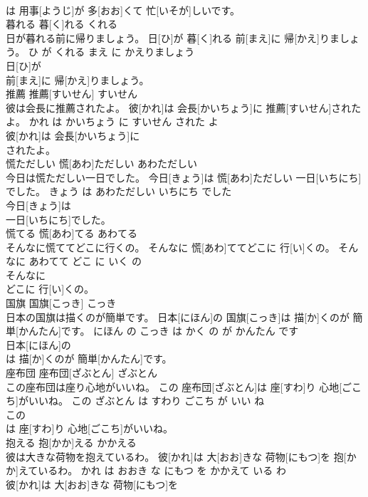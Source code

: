\documentclass[8pt]{extreport}
\begin{document}
\begin{CJK}{UTF8}{min}
\\	は 用事[ようじ]が 多[おお]くて 忙[いそが]しいです。			
\\	暮れる	暮[く]れる	くれる	
\\	日が暮れる前に帰りましょう。	日[ひ]が 暮[く]れる 前[まえ]に 帰[かえ]りましょう。	ひ が くれる まえ に かえりましょう	
\\	日[ひ]が
\\	前[まえ]に 帰[かえ]りましょう。			
\\	推薦	推薦[すいせん]	すいせん	
\\	彼は会長に推薦されたよ。	彼[かれ]は 会長[かいちょう]に 推薦[すいせん]されたよ。	かれ は かいちょう に すいせん された よ	
\\	彼[かれ]は 会長[かいちょう]に
\\	されたよ。			
\\	慌ただしい	慌[あわ]ただしい	あわただしい	
\\	今日は慌ただしい一日でした。	今日[きょう]は 慌[あわ]ただしい 一日[いちにち]でした。	きょう は あわただしい いちにち でした	
\\	今日[きょう]は
\\	一日[いちにち]でした。			
\\	慌てる	慌[あわ]てる	あわてる	
\\	そんなに慌ててどこに行くの。	そんなに 慌[あわ]ててどこに 行[い]くの。	そんなに あわてて どこ に いく の	
\\	そんなに
\\	どこに 行[い]くの。			
\\	国旗	国旗[こっき]	こっき	
\\	日本の国旗は描くのが簡単です。	日本[にほん]の 国旗[こっき]は 描[か]くのが 簡単[かんたん]です。	にほん の こっき は かく の が かんたん です	
\\	日本[にほん]の
\\	は 描[か]くのが 簡単[かんたん]です。			
\\	座布団	座布団[ざぶとん]	ざぶとん	
\\	この座布団は座り心地がいいね。	この 座布団[ざぶとん]は 座[すわ]り 心地[ごこち]がいいね。	この ざぶとん は すわり ごこち が いい ね	
\\	この
\\	は 座[すわ]り 心地[ごこち]がいいね。			
\\	抱える	抱[かか]える	かかえる	
\\	彼は大きな荷物を抱えているわ。	彼[かれ]は 大[おお]きな 荷物[にもつ]を 抱[かか]えているわ。	かれ は おおき な にもつ を かかえて いる わ	
\\	彼[かれ]は 大[おお]きな 荷物[にもつ]を

\end{CJK}
\end{document}
